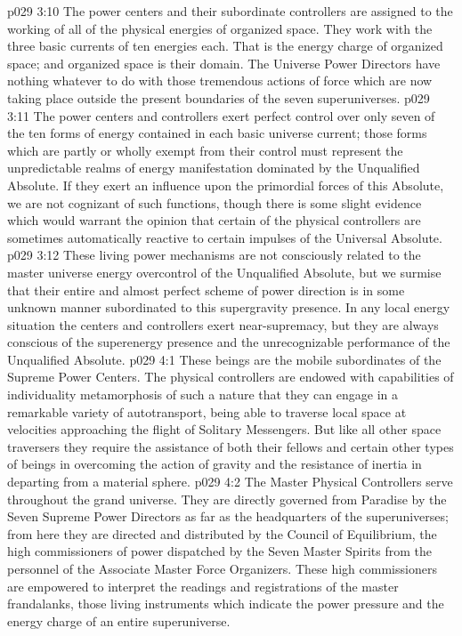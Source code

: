 \pc \vs p029 3:10 The power centers and their subordinate controllers are assigned to the working of all of the physical energies of organized space. They work with the three basic currents of ten energies each. That is the energy charge of organized space; and organized space is their domain. The Universe Power Directors have nothing whatever to do with those tremendous actions of force which are now taking place outside the present boundaries of the seven superuniverses.
\vs p029 3:11 The power centers and controllers exert perfect control over only seven of the ten forms of energy contained in each basic universe current; those forms which are partly or wholly exempt from their control must represent the unpredictable realms of energy manifestation dominated by the Unqualified Absolute. If they exert an influence upon the primordial forces of this Absolute, we are not cognizant of such functions, though there is some slight evidence which would warrant the opinion that certain of the physical controllers are sometimes automatically reactive to certain impulses of the Universal Absolute.
\vs p029 3:12 These living power mechanisms are not consciously related to the master universe energy overcontrol of the Unqualified Absolute, but we surmise that their entire and almost perfect scheme of power direction is in some unknown manner subordinated to this supergravity presence. In any local energy situation the centers and controllers exert near\hyp{}supremacy, but they are always conscious of the superenergy presence and the unrecognizable performance of the Unqualified Absolute.\plusone
{}
\vs p029 4:1 These beings are the mobile subordinates of the Supreme Power Centers. The physical controllers are endowed with capabilities of individuality metamorphosis of such a nature that they can engage in a remarkable variety of autotransport, being able to traverse local space at velocities approaching the flight of Solitary Messengers. But like all other space traversers they require the assistance of both their fellows and certain other types of beings in overcoming the action of gravity and the resistance of inertia in departing from a material sphere.
\vs p029 4:2 The Master Physical Controllers serve throughout the grand universe. They are directly governed from Paradise by the Seven Supreme Power Directors as far as the headquarters of the superuniverses; from here they are directed and distributed by the Council of Equilibrium, the high commissioners of power dispatched by the Seven Master Spirits from the personnel of the Associate Master Force Organizers. These high commissioners are empowered to interpret the readings and registrations of the master frandalanks, those living instruments which indicate the power pressure and the energy charge of an entire superuniverse.
